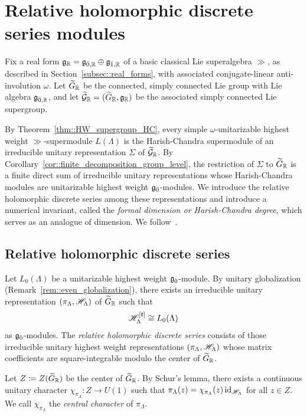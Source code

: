 \section{Relative holomorphic discrete series modules}
\label{sec::relative_holomorphic_discrete_series}
\noindent
Fix a real form ${\mathfrak{g}}_{{\mathbb R}}={\mathfrak{g}}_{\bar0,{\mathbb R}}\oplus{\mathfrak{g}}_{\bar1,{\mathbb R}}$ of a basic classical Lie superalgebra $\gg$, as described in Section~\ref{subsec::real_forms}, with associated conjugate-linear anti-involution $\omega$. Let $\widetilde{G}_{{\mathbb R}}$ be the connected, simply connected Lie group with Lie algebra ${\mathfrak{g}}_{\bar0,{\mathbb R}}$, and let $\widetilde{{\mathcal{G}}}_{{\mathbb R}}=(\widetilde{G}_{{\mathbb R}},{\mathfrak{g}}_{{\mathbb R}})$ be the associated simply connected Lie supergroup.

By Theorem~\ref{thm::HW_supergroup_HC}, every simple $\omega$-unitarizable highest weight $\gg$-supermodule $L(\Lambda)$ is the Harish-Chandra supermodule of an irreducible unitary representation $\Sigma$ of $\widetilde{{\mathcal{G}}}_{{\mathbb R}}$. By Corollary~\ref{cor::finite_decomposition_group_level}, the restriction of $\Sigma$ to $\widetilde{G}_{{\mathbb R}}$ is a finite direct sum of irreducible unitary representations whose Harish-Chandra modules are unitarizable highest weight ${\mathfrak{g}_{\bar{0}}}$-modules. We introduce the relative holomorphic discrete series among these representations and introduce a numerical invariant, called the \emph{formal dimension or Harish-Chandra degree}, which serves as an analogue of dimension. We follow~\cite{NeebSquareIntegrable}.

\subsection{Relative holomorphic discrete series}
\label{subsec::relative_holomorphic_discrete_series}

Let $L_{0}(\Lambda)$ be a unitarizable highest weight ${\mathfrak{g}_{\bar{0}}}$-module. By unitary globalization (Remark~\ref{rem::even_globalization}), there exists an irreducible unitary representation $(\pi_{\Lambda},{\mathscr{H}}_{\Lambda})$ of $\widetilde{G}_{{\mathbb R}}$ such that
\begin{equation}
{\mathscr{H}}_{\Lambda}^{[{\mathfrak k}]}
\cong
L_{0}(\Lambda)
\end{equation}
as ${\mathfrak{g}_{\bar{0}}}$-modules. The \emph{relative holomorphic discrete series} consists of those irreducible unitary highest weight representations $(\pi_{\Lambda},{\mathscr{H}}_{\Lambda})$ whose matrix coefficients are square-integrable modulo the center of $\widetilde{G}_{{\mathbb R}}$.

Let $Z\coloneqq Z(\widetilde{G}_{{\mathbb R}})$ be the center of $\widetilde{G}_{{\mathbb R}}$. By Schur's lemma, there exists a continuous unitary character
$
\chi_{\pi_{\Lambda}}:Z\to U(1)
$
such that
$
\pi_{\Lambda}(z)=\chi_{\pi_{\Lambda}}(z)\operatorname{id}_{{\mathscr{H}}_{\Lambda}}
$
for all $z\in Z$. We call $\chi_{\pi_{\Lambda}}$ the \emph{central character} of $\pi_{\Lambda}$.

